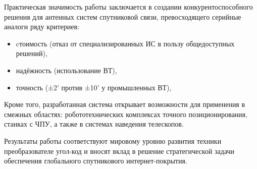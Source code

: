 Практическая значимость работы заключается в создании конкурентоспособного решения для антенных систем спутниковой связи, 
превосходящего серийные аналоги ряду критериев:
\begin{itemize}
    \item cтоимость (отказ от специализированных ИС в пользу общедоступных решений),
    \item надёжность (использование ВТ),
    \item точность (±2' против ±10' у промышленных ВТ),
\end{itemize}

Кроме того, разработанная система открывает возможности для применения в смежных областях: робототехнических комплексах точного позиционирования, 
станках с ЧПУ, а также в системах наведения телескопов.

Результаты работы соответствуют мировому уровню развития техники преобразователе угол-код и вносят вклад в решение стратегической задачи обеспечения 
глобального спутникового интернет-покрытия.
